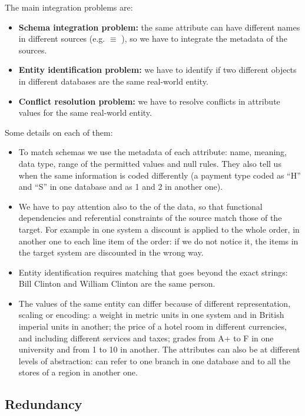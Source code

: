 The main integration problems are:
\begin{itemize}
    \item \textbf{Schema integration problem:} the same attribute can have different names in different sources (e.g.  $\equiv$ ), so we have to integrate the metadata of the sources.
    \item \textbf{Entity identification problem:} we have to identify if two different objects in different databases are the same real-world entity.
    \item \textbf{Conflict resolution problem:} we have to resolve conflicts in attribute values for the same real-world entity.

\end{itemize}

Some details on each of them:
\begin{itemize}
    \item To match schemas we use the metadata of each attribute: name, meaning, data type, range of the permitted values and null rules. They also tell us when the same information is coded differently (a payment type coded as ``H'' and ``S'' in one database and as 1 and 2 in another one).
    \item We have to pay attention also to the  of the data, so that functional dependencies and referential constraints of the source match those of the target. For example in one system a discount is applied to the whole order, in another one to each line item of the order: if we do not notice it, the items in the target system are discounted in the wrong way.
    \item Entity identification requires matching that goes beyond the exact strings: Bill Clinton and William Clinton are the same person.
    \item The values of the same entity can differ because of different representation, scaling or encoding: a weight in metric units in one system and in British imperial units in another; the price of a hotel room in different currencies, and including different services and taxes; grades from A+ to F in one university and from 1 to 10 in another. The attributes can also be at different levels of abstraction:  can refer to one branch in one database and to all the stores of a region in another one.
\end{itemize}


\subsection{Redundancy}

